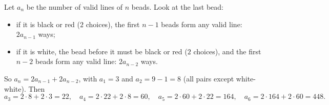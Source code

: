 Let $a_n$ be the number of valid lines of $n$ beads. Look at the last bead:
\begin{itemize}
\item if it is black or red ($2$ choices), the first $n-1$ beads form any valid line: $2a_{n-1}$ ways;
\item if it is white, the bead before it must be black or red ($2$ choices), and the first $n-2$ beads form any valid line: $2a_{n-2}$ ways.
\end{itemize}
So $a_n=2a_{n-1}+2a_{n-2}$, with $a_1=3$ and $a_2=9-1=8$ (all pairs except white-white). Then
\[a_3=2\cdot8+2\cdot3=22,\quad a_4=2\cdot22+2\cdot8=60,\quad a_5=2\cdot60+2\cdot22=164,\quad a_6=2\cdot164+2\cdot60=\boxed{448}.\]
